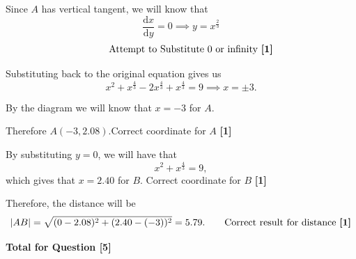 \documentclass[12pt]{article}
\begin{document}
            Since \(A\) has vertical tangent, we will know that
            \[
                \frac{\mathrm{d}x}{\mathrm{d}y} = 0 \implies y = x^{\frac{2}{3}}
            \]
            \[\tag*{Attempt to Substitute 0 or infinity \textbf{[1]}}\]

            Substituting back to the original equation gives us
            \[
                x^2 + x^{\frac{4}{3}} - 2x^{\frac{4}{3}} + x^{\frac{4}{3}} = 9 \implies x = \pm 3.
            \]

            By the diagram we will know that \(x = -3\) for \(A\).
            
            Therefore \(A(-3, 2.08)\).\hfill{Correct coordinate for \(A\) \textbf{[1]}}

            By substituting \(y = 0\), we will have that
            \[
                x^2 + x^{\frac{4}{3}} = 9,
            \]
            which gives that \(x = 2.40\) for \(B\). \hfill{Correct coordinate for \(B\) \textbf{[1]}}

            Therefore, the distance will be
            \[
                |AB| = \sqrt{(0 - 2.08)^2 + (2.40 - (-3))^2} = 5.79. \tag*{Correct result for distance \textbf{[1]}}
            \]
            
            \hfill\textbf{Total for Question [5]}
    
\end{document}
